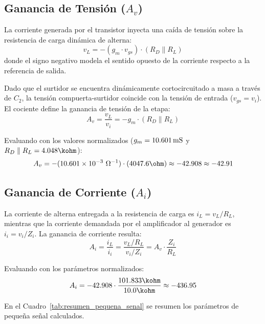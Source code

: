 \subsection{Ganancia de Tensión (\texorpdfstring{$A_v$}{Av})}
La corriente generada por el transistor inyecta una caída de tensión sobre la resistencia de carga dinámica de alterna:
\begin{equation}
  v_L = -(g_m \cdot v_{gs}) \cdot (R_D \parallel R_L)
  \label{eq:vl_pequena_senal}
\end{equation}
donde el signo negativo modela el sentido opuesto de la corriente respecto a la referencia de salida.

Dado que el surtidor se encuentra dinámicamente cortocircuitado a masa a través de $C_2$, la tensión compuerta-surtidor
coincide con la tensión de entrada ($v_{gs} = v_i$). El cociente define la ganancia de tensión de la etapa:
\begin{equation}
  A_v = \frac{v_L}{v_i} = -g_m \cdot (R_D \parallel R_L)
  \label{eq:Av_analitica}
\end{equation}

Evaluando con los valores normalizados ($g_m = 10.601\,\mathrm{mS}$ y $R_D \parallel R_L = 4.048\kohm$):
\begin{equation}
  A_v = -(10.601 \times 10^{-3}\ \Omega^{-1}) \cdot (4047.6\ohm) \approx -42.908 \approx -42.91
  \label{eq:Av_normalizada_val}
\end{equation}

\subsection{Ganancia de Corriente (\texorpdfstring{$A_i$}{Ai})}
La corriente de alterna entregada a la resistencia de carga es $i_L = v_L / R_L$, mientras que la corriente demandada
por el amplificador al generador es $i_i = v_i / Z_i$. La ganancia de corriente resulta:
\begin{equation}
  A_i = \frac{i_L}{i_i} = \frac{v_L / R_L}{v_i / Z_i} = A_v \cdot \frac{Z_i}{R_L}
  \label{eq:Ai_analitica}
\end{equation}

Evaluando con los parámetros normalizados:
\begin{equation}
  A_i = -42.908 \cdot \frac{101.833\kohm}{10.0\kohm} \approx -436.95
  \label{eq:Ai_normalizada_val}
\end{equation}

En el Cuadro~\ref{tab:resumen_pequena_senal} se resumen los parámetros de pequeña señal calculados.

